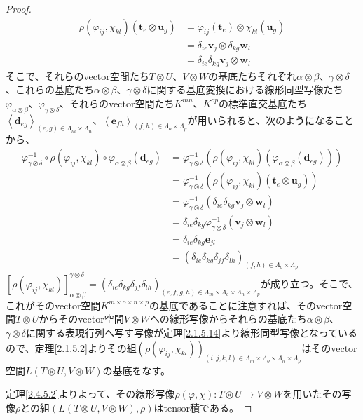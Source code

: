 \documentclass[dvipdfmx]{jsarticle}
\begin{document}
\begin{proof}
\begin{align*}
\rho\left( \varphi_{ij},\chi_{kl} \right)\left( \mathbf{t}_{e} \otimes \mathbf{u}_{g} \right) &= \varphi_{ij}\left( \mathbf{t}_{e} \right) \otimes \chi_{kl}\left( \mathbf{u}_{g} \right)\\
&= \delta_{ie}\mathbf{v}_{j} \otimes \delta_{kg}\mathbf{w}_{l}\\
&= \delta_{ie}\delta_{kg}\mathbf{v}_{j} \otimes \mathbf{w}_{l}
\end{align*}
そこで、それらのvector空間たち$T \otimes U$、$V \otimes W$の基底たちそれぞれ$\alpha \otimes \beta$、$\gamma \otimes \delta$、これらの基底たち$\alpha \otimes \beta$、$\gamma \otimes \delta$に関する基底変換における線形同型写像たち$\varphi_{\alpha \otimes \beta}$、$\varphi_{\gamma \otimes \delta}$、それらのvector空間たち$K^{mn}$、$K^{op}$の標準直交基底たち$\left\langle \mathbf{d}_{eg} \right\rangle_{(e,g) \in \varLambda_{m} \times \varLambda_{n}}$、$\left\langle \mathbf{e}_{fh} \right\rangle_{(f,h) \in \varLambda_{o} \times \varLambda_{p}}$が用いられると、次のようになることから、
\begin{align*}
\varphi_{\gamma \otimes \delta}^{- 1} \circ \rho\left( \varphi_{ij},\chi_{kl} \right) \circ \varphi_{\alpha \otimes \beta}\left( \mathbf{d}_{eg} \right) &= \varphi_{\gamma \otimes \delta}^{- 1}\left( \rho\left( \varphi_{ij},\chi_{kl} \right)\left( \varphi_{\alpha \otimes \beta}\left( \mathbf{d}_{eg} \right) \right) \right)\\
&= \varphi_{\gamma \otimes \delta}^{- 1}\left( \rho\left( \varphi_{ij},\chi_{kl} \right)\left( \mathbf{t}_{e} \otimes \mathbf{u}_{g} \right) \right)\\
&= \varphi_{\gamma \otimes \delta}^{- 1}\left( \delta_{ie}\delta_{kg}\mathbf{v}_{j} \otimes \mathbf{w}_{l} \right)\\
&= \delta_{ie}\delta_{kg}\varphi_{\gamma \otimes \delta}^{- 1}\left( \mathbf{v}_{j} \otimes \mathbf{w}_{l} \right)\\
&= \delta_{ie}\delta_{kg}\mathbf{e}_{jl}\\
&= \left( \delta_{ie}\delta_{kg}\delta_{jf}\delta_{lh} \right)_{(f,h) \in \varLambda_{o} \times \varLambda_{p}}
\end{align*}
$\left[ \rho\left( \varphi_{ij},\chi_{kl} \right) \right]^{\gamma \otimes \delta}_{\alpha \otimes \beta} = \left( \delta_{ie}\delta_{kg}\delta_{jf}\delta_{lh} \right)_{(e,f,g,h) \in \varLambda_{m} \times \varLambda_{o} \times \varLambda_{n} \times \varLambda_{p}}$が成り立つ。そこで、これがそのvector空間$K^{m \times o \times n \times p}$の基底であることに注意すれば、そのvector空間$T \otimes U$からそのvector空間$V \otimes W$への線形写像からそれらの基底たち$\alpha \otimes \beta$、$\gamma \otimes \delta$に関する表現行列へ写す写像が定理\ref{2.1.5.14}より線形同型写像となっているので、定理\ref{2.1.5.2}よりその組$\left(\rho\left( \varphi_{ij},\chi_{kl} \right)\right)_{(i,j,k,l) \in \varLambda_{m} \times \varLambda_{o}\times \varLambda_{n} \times \varLambda_{p}}$はそのvector空間$L(T \otimes U,V \otimes W)$の基底をなす。\par
定理\ref{2.4.5.2}よりよって、その線形写像$\rho(\varphi,\chi):T \otimes U \rightarrow V \otimes W$を用いたその写像$\rho$との組$\left( L(T \otimes U,V \otimes W),\rho \right)$はtensor積である。
\end{proof}
\end{document}
